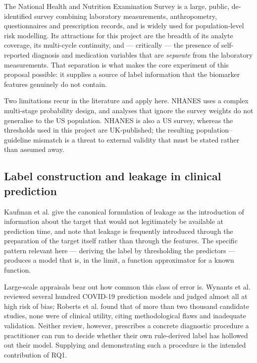 \documentclass[11pt,a4paper]{article}
\begin{document}
The National Health and Nutrition Examination Survey \cite{cdc2021nhanes} is a
large, public, de-identified survey combining laboratory measurements,
anthropometry, questionnaires and prescription records, and is widely used for
population-level risk modelling. Its attractions for this project are the breadth
of its analyte coverage, its multi-cycle continuity, and --- critically --- the
presence of self-reported diagnosis and medication variables that are
\emph{separate} from the laboratory measurements. That separation is what makes the
core experiment of this proposal possible: it supplies a source of label
information that the biomarker features genuinely do not contain.

Two limitations recur in the literature and apply here. NHANES uses a complex
multi-stage probability design, and analyses that ignore the survey weights do not
generalise to the US population. NHANES is also a US survey, whereas the thresholds
used in this project are UK-published; the resulting population--guideline mismatch
is a threat to external validity that must be stated rather than assumed away.

\subsection{Label construction and leakage in clinical prediction}

Kaufman et al. \cite{kaufman2012leakage} give the canonical formulation of leakage
as the introduction of information about the target that would not legitimately be
available at prediction time, and note that leakage is frequently introduced
through the preparation of the target itself rather than through the features. The
specific pattern relevant here --- deriving the label by thresholding the
predictors --- produces a model that is, in the limit, a function approximator for
a known function.

Large-scale appraisals bear out how common this class of error is. Wynants et al.
\cite{wynants2020prediction} reviewed several hundred COVID-19 prediction models
and judged almost all at high risk of bias; Roberts et al.
\cite{roberts2021common} found that of more than two thousand candidate studies,
none were of clinical utility, citing methodological flaws and inadequate
validation. Neither review, however, prescribes a concrete diagnostic procedure a
practitioner can run to decide whether their own rule-derived label has hollowed
out their model. Supplying and demonstrating such a procedure is the intended
contribution of RQ1.
\end{document}
